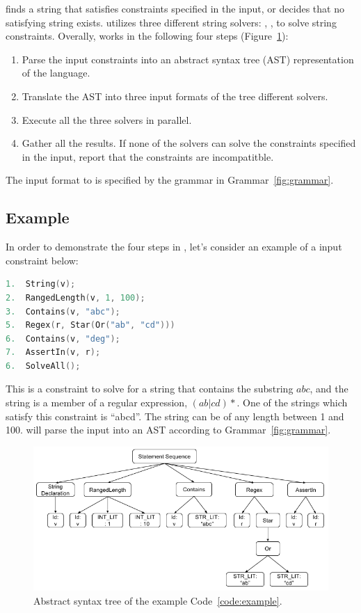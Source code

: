 \imss finds a string that satisfies constraints specified in the input,
or decides that no satisfying string exists. \imss utilizes three different
string solvers: , ,  to solve string
constraints. Overally, \imss works in the following four steps (Figure~\ref{fig:imss}):
\begin{enumerate}
    \item Parse the input constraints into an abstract syntax tree (AST)
    representation of the \imss language.
    \item Translate the AST into three input formats of the tree different solvers.
    \item Execute all the three solvers in parallel.
    \item Gather all the results. If none of the solvers can solve the constraints
    specified in the input, report that the constraints are incompatitble.
\end{enumerate}
The input format to \imss is specified by the grammar in Grammar~\ref{fig:grammar}.

\subsection{Example}

In order to demonstrate the four steps in \imss, let's consider an example of a input constraint
below:
\renewcommand\lstlistingname{Code}
\begin{lstlisting}[label={code:example},frame=bt,numbers=none,basicstyle=\ttfamily\scriptsize,
language=C,captionpos=b,caption={Input constraint in \imss format}]
1.  String(v);
2.  RangedLength(v, 1, 100);
3.  Contains(v, "abc");
5.  Regex(r, Star(Or("ab", "cd")))
6.  Contains(v, "deg");
7.  AssertIn(v, r);
6.  SolveAll();
\end{lstlisting}
This is a constraint to solve for a string that contains the substring $abc$, and
the string is a member of a regular expression, $(ab|cd)*$.
One of the strings which satisfy this constraint is ``abcd''. The string can be of any length
between 1 and 100. \imss will parse the input into an AST according to Grammar~\ref{fig:grammar}.

\begin{figure}[H]
    \centering
    \includegraphics[scale=0.35]{example-ast}
    \caption{\label{fig:imss}Abstract syntax tree of the example Code~\ref{code:example}.}
\end{figure}

